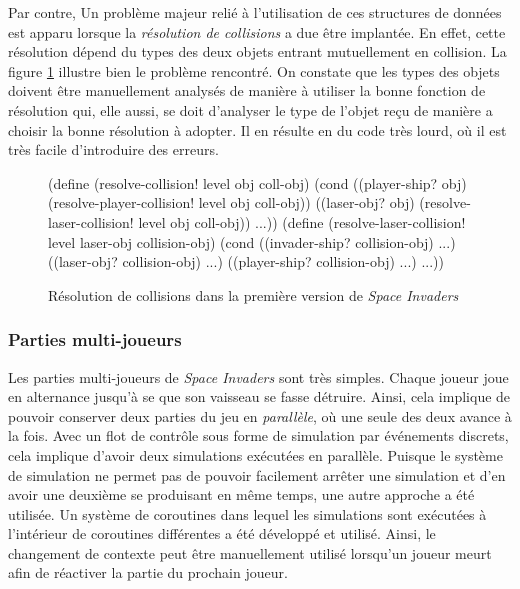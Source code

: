 \documentclass[12pt,oneside,letterpaper,francais]{book}
\newcommand{\si}{{\textit{Space Invaders }}}
\begin{document}
Par contre, Un problème majeur relié à l'utilisation de ces structures
de données est apparu lorsque la \emph{résolution de collisions} a due
être implantée. En effet, cette résolution dépend du types des deux
objets entrant mutuellement en collision. La figure
\ref{Exp:si1-col-res} illustre bien le problème rencontré. On constate
que les types des objets doivent être manuellement analysés de manière
à utiliser la bonne fonction de résolution qui, elle aussi, se doit
d'analyser le type de l'objet reçu de manière a choisir la bonne
résolution à adopter. Il en résulte en du code très lourd, où il est
très facile d'introduire des erreurs.

\begin{figure}[htb!]
  \begin{schemecode}
(define (resolve-collision! level obj coll-obj)
  (cond
   ((player-ship? obj) (resolve-player-collision! level obj coll-obj))
   ((laser-obj? obj) (resolve-laser-collision! level obj coll-obj))
   ...))
(define (resolve-laser-collision! level laser-obj collision-obj)
  (cond ((invader-ship? collision-obj) ...)
        ((laser-obj? collision-obj) ...)
        ((player-ship? collision-obj) ...)
        ...))
  \end{schemecode}
  \caption{Résolution de collisions dans la première version de \si}
  \label{Exp:si1-col-res}
\end{figure}

\subsubsection{Parties multi-joueurs}

Les parties multi-joueurs de \si sont très simples. Chaque joueur joue
en alternance jusqu'à se que son vaisseau se fasse détruire. Ainsi,
cela implique de pouvoir conserver deux parties du jeu en
\emph{parallèle}, où une seule des deux avance à la fois. Avec un flot
de contrôle sous forme de simulation par événements discrets, cela
implique d'avoir deux simulations exécutées en parallèle. Puisque le
système de simulation ne permet pas de pouvoir facilement arrêter une
simulation et d'en avoir une deuxième se produisant en même temps, une
autre approche a été utilisée. Un système de coroutines dans lequel
les simulations sont exécutées à l'intérieur de coroutines différentes
a été développé et utilisé. Ainsi, le changement de contexte peut être
manuellement utilisé lorsqu'un joueur meurt afin de réactiver la
partie du prochain joueur.
\end{document}
